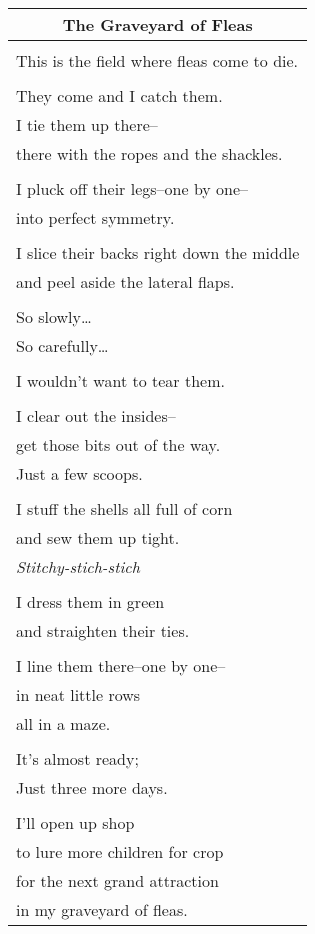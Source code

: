 \documentclass{article}
\begin{document}
\begin{center}
\begin{tabular}{l}
\multicolumn{1}{c}{\textbf{The Graveyard of Fleas}} \\ \hline
\\
This is the field where fleas come to die. \\
\\
They come and I catch them. \\
I tie them up there-- \\
there with the ropes and the shackles. \\
\\
I pluck off their legs--one by one-- \\
into perfect symmetry. \\
\\
I slice their backs right down the middle \\
and peel aside the lateral flaps. \\
\\
So slowly\ldots{} \\
So carefully\ldots{} \\
\\
I wouldn't want to tear them. \\
\\
I clear out the insides-- \\
get those bits out of the way. \\
Just a few scoops. \\
\\
I stuff the shells all full of corn \\
and sew them up tight. \\
\textit{Stitchy-stich-stich} \\
\\
I dress them in green \\
and straighten their ties. \\
\\
I line them there--one by one-- \\
in neat little rows \\
all in a maze. \\
\\
It's almost ready; \\
Just three more days. \\
\\
I'll open up shop \\
to lure more children for crop \\ %
for the next grand attraction \\ %
in my graveyard of fleas. \\
\end{tabular}
\end{center}
\end{document}
